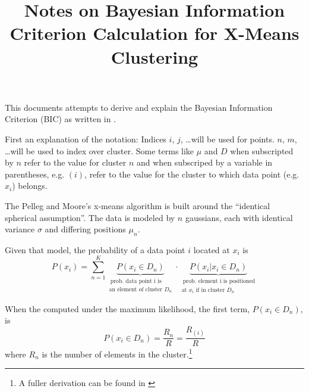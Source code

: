 \documentclass[letterpaper]{article}
\begin{document}
\title{Notes on Bayesian Information Criterion Calculation for X-Means Clustering}

\maketitle

This documents attempts to derive and explain the Bayesian Information
Criterion (BIC) as written in \cite{Pelleg2000}.

First an explanation of the notation: Indices $i$, $j$, \ldots will be
used for points.  $n$, $m$, \ldots will be used to index over cluster.
Some terms like $\mu$ and $D$ when subscripted by $n$ refer to the
value for cluster $n$ and when subscriped by a variable in
parentheses, e.g. $(i)$, refer to the value for the cluster to which
data point (e.g. $x_i$) belongs.

The Pelleg and Moore's x-means algorithm is built around the
``identical spherical assumption''.  The data is modeled by $n$
gaussians, each with identical variance $\sigma$ and differing
positions $\mu_n$.

Given that model, the probability of a data point $i$ located at $x_i$ is
%
\begin{equation}
  \label{eq:1}
  P(x_i) = \sum_{n=1}^K
               \underbrace{P(x_i \in D_n)}_{\substack{\
                  \text{prob.\ data point i is} \\
                  \text{an element of cluster $D_n$}}}
               \cdot \underbrace{P(x_i | x_i \in D_n)}_{\substack{\
                  \text{prob.\ element i is positioned} \\
                  \text{at $x_i$ if in cluster $D_n$}}}
\end{equation}

When the computed under the maximum likelihood, the first term, $P(x_i
\in D_n)$, is
\begin{equation}
  \label{eq:2}
  P(x_i \in D_n) = \frac{R_n}{R} = \frac{R_{(i)}}{R}
\end{equation}
where $R_n$ is the number of elements in the cluster.\footnote{A
  fuller derivation can be found in \cite{DaumeIII2009}}


\end{document}
